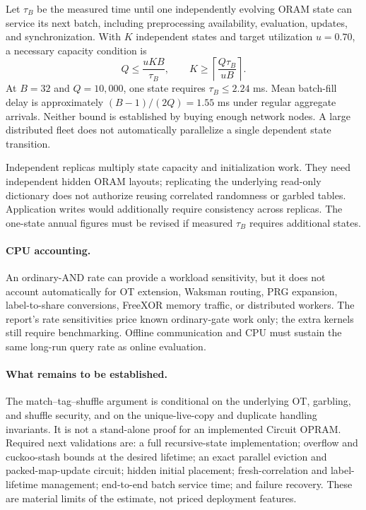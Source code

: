 \documentclass[11pt]{article}
\newcommand{\ceil}[1]{\left\lceil #1\right\rceil}
\begin{document}
Let $\tau_B$ be the measured time until one independently evolving ORAM
state can service its next batch, including preprocessing availability,
evaluation, updates, and synchronization. With $K$ independent states and
target utilization $u=0.70$, a necessary capacity condition is
\begin{equation}
 Q\le\frac{uKB}{\tau_B},\qquad
 K\ge\ceil{\frac{Q\tau_B}{uB}}.
\end{equation}
At $B=32$ and $Q=10{,}000$, one state requires $\tau_B\le2.24$ ms.
Mean batch-fill delay is approximately $(B-1)/(2Q)=1.55$ ms under regular
aggregate arrivals. Neither bound is established by buying enough network
nodes. A large distributed fleet does not automatically parallelize a
single dependent state transition.

Independent replicas multiply state capacity and initialization work.
They need independent hidden ORAM layouts; replicating the underlying
read-only dictionary does not authorize reusing correlated randomness or
garbled tables. Application writes would additionally require consistency
across replicas. The one-state annual figures must be revised if measured
$\tau_B$ requires additional states.

\paragraph{CPU accounting.}
An ordinary-AND rate can provide a workload sensitivity, but it does not
account automatically for OT extension, Waksman routing, PRG expansion,
label-to-share conversions, FreeXOR memory traffic, or distributed workers.
The report's rate sensitivities price known ordinary-gate work only; the
extra kernels still require benchmarking. Offline communication and CPU
must sustain the same long-run query rate as online evaluation.

\paragraph{What remains to be established.}
The match--tag--shuffle argument is conditional on the underlying OT,
garbling, and shuffle security, and on the unique-live-copy and duplicate
handling invariants. It is not a stand-alone proof for an implemented
Circuit OPRAM. Required next validations are: a full recursive-state
implementation; overflow and cuckoo-stash bounds at the desired lifetime;
an exact parallel eviction and packed-map-update circuit; hidden initial
placement; fresh-correlation and label-lifetime management; end-to-end
batch service time; and failure recovery. These are material limits of the
estimate, not priced deployment features.
\end{document}

